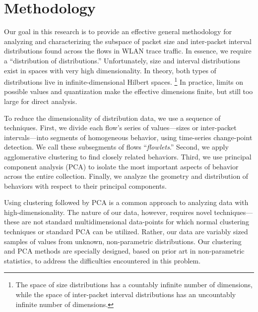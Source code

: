 \documentclass[conference]{IEEEtran}
\newcommand{\caps}[1]{{\small{#1}}}
\begin{document}
\section{Methodology}\label{sec:methodology}

Our goal in this research is to provide an effective general methodology for analyzing and characterizing the subspace of packet size and inter-packet interval distributions found across the flows in \caps{WLAN} trace traffic. In essence, we require a ``distribution of distributions.'' %
Unfortunately, size and interval distributions exist in spaces with very high dimensionality. In theory, both types of distributions live in infinite-dimensional Hilbert spaces.%
\footnote{The space of size distributions has a countably infinite number of dimensions, while the space of inter-packet interval distributions has an uncountably infinite number of dimensions.}
In practice, limits on possible values and quantization make the effective dimensions finite, but still too large for direct analysis.%

To reduce the dimensionality of distribution data, we use a sequence of techniques.
First, we divide each flow's series of values---sizes or inter-packet intervals---into segments of homogeneous behavior, using time-series change-point detection. We call these subsegments of flows ``\textit{flowlets}.'' Second, we apply agglomerative clustering to find closely related behaviors. Third, we use principal component analysis (\caps{PCA}) to isolate the most important aspects of behavior across the entire collection. Finally, we analyze the geometry and distribution of behaviors with respect to their principal components.

Using clustering followed by \caps{PCA} is a common approach to analyzing data with high-dimensionality. %
The nature of our data, however, requires novel techniques---these are not standard multidimensional data-points for which normal clustering techniques or standard \caps{PCA} can be utilized. Rather, our data are variably sized samples of values from unknown, non-parametric distributions. Our clustering and \caps{PCA} methods are specially designed, based on prior art in non-parametric statistics, to address the difficulties encountered in this problem.
\end{document}
